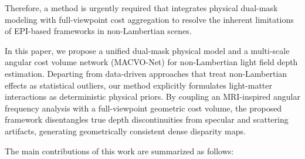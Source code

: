 \documentclass[lettersize,journal]{IEEEtran}
\begin{document}
Therefore, a method is urgently required that integrates physical dual-mask modeling with full-viewpoint cost aggregation to resolve the inherent limitations of EPI-based frameworks in non-Lambertian scenes.

In this paper, we propose a unified dual-mask physical model and a multi-scale angular cost volume network (MACVO-Net) for non-Lambertian light field depth estimation. Departing from data-driven approaches that treat non-Lambertian effects as statistical outliers, our method explicitly formulates light-matter interactions as deterministic physical priors. By coupling an MRI-inspired angular frequency analysis with a full-viewpoint geometric cost volume, the proposed framework disentangles true depth discontinuities from specular and scattering artifacts, generating geometrically consistent dense disparity maps.

The main contributions of this work are summarized as follows:
\end{document}
